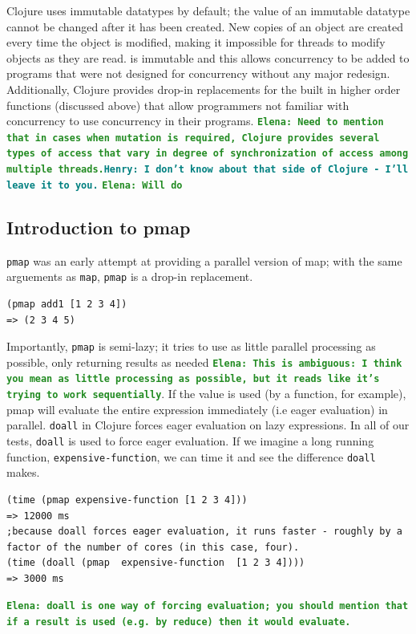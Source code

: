 \documentclass[12pt]{article}
\newcommand{\comment}[1]{{\bf \tt  {#1}}}
\newcommand{\emcomment}[1]{\textcolor{ForestGreen}{\comment{Elena: {#1}}}}
\newcommand{\hfcomment}[1]{\textcolor{Teal}{\comment{Henry: {#1}}}}
\newcommand{\clocode}[1]{{\texttt {#1}}}
\begin{document}
Clojure uses immutable datatypes by default; the value of an immutable datatype cannot be changed after it has been created. New copies of an object are created every time the object is modified, making it impossible for threads to modify objects as they are read. is immutable and this allows concurrency to be added to programs that were not designed for concurrency without any major redesign. Additionally, Clojure provides drop-in replacements for the built in higher order functions (discussed above) that allow programmers not familiar with concurrency to use concurrency in their programs.
\emcomment{Need to mention that in cases when mutation is required, Clojure provides several types of access that vary in degree of synchronization of access among multiple threads.}\hfcomment{I don't know about that side of Clojure - I'll leave it to you.}
\emcomment{Will do}


\subsection{Introduction to pmap}\label{sec:pmap}
\clocode{pmap} was an early attempt at providing a parallel version of map; with the same arguements as \clocode{map}, \clocode{pmap} is a drop-in replacement. 
\begin{verbatim}
(pmap add1 [1 2 3 4])
=> (2 3 4 5)
\end{verbatim}
Importantly, \clocode{pmap} is semi-lazy; it %
tries to use as little parallel processing as possible, only returning results as needed \emcomment{This is ambiguous: I think you mean as little processing as possible, but it reads like it's trying to work sequentially}. If the value is used (by a function, for example), pmap will evaluate the entire expression immediately (i.e eager evaluation) in parallel. \clocode{doall} in Clojure forces eager evaluation on lazy expressions. In all of our tests, \clocode{doall} is used to force eager evaluation. If we imagine a long running function, \clocode{expensive-function}, we can time it and see the difference \clocode{doall} makes.
\begin{verbatim}
(time (pmap expensive-function [1 2 3 4]))
=> 12000 ms 
;because doall forces eager evaluation, it runs faster - roughly by a factor of the number of cores (in this case, four).
(time (doall (pmap  expensive-function  [1 2 3 4])))
=> 3000 ms
\end{verbatim}

 \emcomment{doall is one way of forcing evaluation; you should mention that if a result is used (e.g. by reduce) then it would evaluate. }
\end{document}

